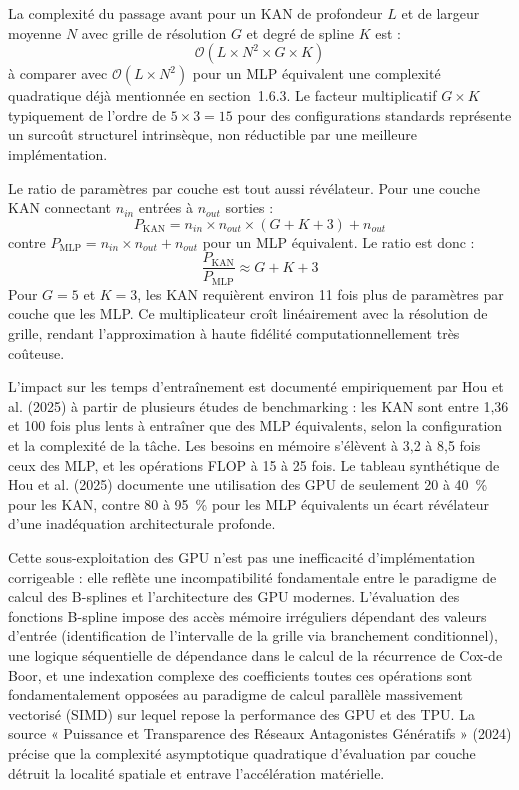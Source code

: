 \documentclass[11pt,a4paper,oneside]{report}
\theoremstyle{definition}
\theoremstyle{remark}
\begin{document}
La complexité du passage avant pour un KAN de profondeur $L$ et de largeur moyenne $N$ avec grille de résolution $G$ et degré de spline $K$ est :
\begin{equation}
\mathcal{O}(L \times N^2 \times G \times K)
\end{equation}
à comparer avec $\mathcal{O}(L \times N^2)$ pour un MLP équivalent  une complexité quadratique déjà mentionnée en section~1.6.3. Le facteur multiplicatif $G \times K$  typiquement de l'ordre de $5 \times 3 = 15$ pour des configurations standards  représente un surcoût structurel intrinsèque, non réductible par une meilleure implémentation.

Le ratio de paramètres par couche est tout aussi révélateur. Pour une couche KAN connectant $n_{in}$ entrées à $n_{out}$ sorties :
\begin{equation}
P_{\text{KAN}} = n_{in} \times n_{out} \times (G + K + 3) + n_{out}
\end{equation}
contre $P_{\text{MLP}} = n_{in} \times n_{out} + n_{out}$ pour un MLP équivalent. Le ratio est donc :
\begin{equation}
\frac{P_{\text{KAN}}}{P_{\text{MLP}}} \approx G + K + 3
\end{equation}
Pour $G = 5$ et $K = 3$, les KAN requièrent environ 11 fois plus de paramètres par couche que les MLP. Ce multiplicateur croît linéairement avec la résolution de grille, rendant l'approximation à haute fidélité computationnellement très coûteuse.

L'impact sur les temps d'entraînement est documenté empiriquement par Hou et al. (2025) à partir de plusieurs études de benchmarking : les KAN sont entre 1,36 et 100 fois plus lents à entraîner que des MLP équivalents, selon la configuration et la complexité de la tâche. Les besoins en mémoire s'élèvent à 3,2 à 8,5 fois ceux des MLP, et les opérations FLOP à 15 à 25 fois. Le tableau synthétique de Hou et al. (2025) documente une utilisation des GPU de seulement 20 à 40~\% pour les KAN, contre 80 à 95~\% pour les MLP équivalents  un écart révélateur d'une inadéquation architecturale profonde.

Cette sous-exploitation des GPU n'est pas une inefficacité d'implémentation corrigeable : elle reflète une incompatibilité fondamentale entre le paradigme de calcul des B-splines et l'architecture des GPU modernes. L'évaluation des fonctions B-spline impose des accès mémoire irréguliers dépendant des valeurs d'entrée (identification de l'intervalle de la grille via branchement conditionnel), une logique séquentielle de dépendance dans le calcul de la récurrence de Cox-de Boor, et une indexation complexe des coefficients  toutes ces opérations sont fondamentalement opposées au paradigme de calcul parallèle massivement vectorisé (SIMD) sur lequel repose la performance des GPU et des TPU. La source « Puissance et Transparence des Réseaux Antagonistes Génératifs » (2024) précise que la complexité asymptotique quadratique d'évaluation par couche détruit la localité spatiale et entrave l'accélération matérielle.
\end{document}
